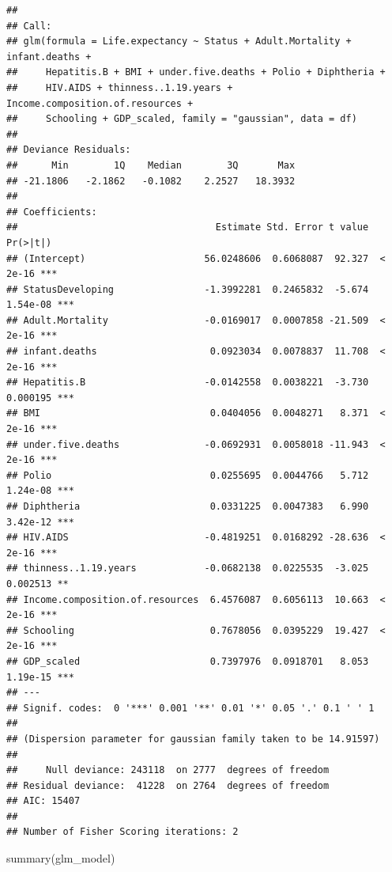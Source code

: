 \documentclass[
]{article}
\newenvironment{Shaded}{\begin{snugshade}}{\end{snugshade}}
\newcommand{\FunctionTok}[1]{\textcolor[rgb]{0.00,0.00,0.00}{#1}}
\newcommand{\NormalTok}[1]{#1}
\begin{document}
\begin{verbatim}
## 
## Call:
## glm(formula = Life.expectancy ~ Status + Adult.Mortality + infant.deaths + 
##     Hepatitis.B + BMI + under.five.deaths + Polio + Diphtheria + 
##     HIV.AIDS + thinness..1.19.years + Income.composition.of.resources + 
##     Schooling + GDP_scaled, family = "gaussian", data = df)
## 
## Deviance Residuals: 
##      Min        1Q    Median        3Q       Max  
## -21.1806   -2.1862   -0.1082    2.2527   18.3932  
## 
## Coefficients:
##                                   Estimate Std. Error t value Pr(>|t|)    
## (Intercept)                     56.0248606  0.6068087  92.327  < 2e-16 ***
## StatusDeveloping                -1.3992281  0.2465832  -5.674 1.54e-08 ***
## Adult.Mortality                 -0.0169017  0.0007858 -21.509  < 2e-16 ***
## infant.deaths                    0.0923034  0.0078837  11.708  < 2e-16 ***
## Hepatitis.B                     -0.0142558  0.0038221  -3.730 0.000195 ***
## BMI                              0.0404056  0.0048271   8.371  < 2e-16 ***
## under.five.deaths               -0.0692931  0.0058018 -11.943  < 2e-16 ***
## Polio                            0.0255695  0.0044766   5.712 1.24e-08 ***
## Diphtheria                       0.0331225  0.0047383   6.990 3.42e-12 ***
## HIV.AIDS                        -0.4819251  0.0168292 -28.636  < 2e-16 ***
## thinness..1.19.years            -0.0682138  0.0225535  -3.025 0.002513 ** 
## Income.composition.of.resources  6.4576087  0.6056113  10.663  < 2e-16 ***
## Schooling                        0.7678056  0.0395229  19.427  < 2e-16 ***
## GDP_scaled                       0.7397976  0.0918701   8.053 1.19e-15 ***
## ---
## Signif. codes:  0 '***' 0.001 '**' 0.01 '*' 0.05 '.' 0.1 ' ' 1
## 
## (Dispersion parameter for gaussian family taken to be 14.91597)
## 
##     Null deviance: 243118  on 2777  degrees of freedom
## Residual deviance:  41228  on 2764  degrees of freedom
## AIC: 15407
## 
## Number of Fisher Scoring iterations: 2
\end{verbatim}

\begin{Shaded}
\begin{Highlighting}[]
\FunctionTok{summary}\NormalTok{(glm\_model)}
\end{Highlighting}
\end{Shaded}
\end{document}
